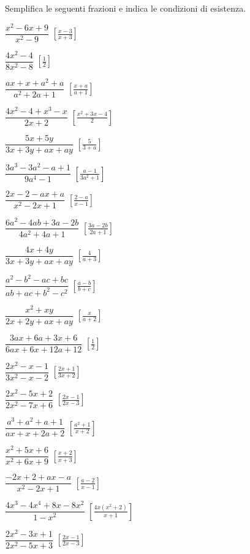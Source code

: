 \begin{esercizio}[\Ast]
\label{ese:19.5}
Semplifica le seguenti frazioni e indica le condizioni di esistenza.
\begin{multicols}{2}
\begin{enumeratea}
 \item $\dfrac{x^{2}-6x+9}{x^{2}-9}$
  \hfill $\left[\frac{x-3}{x+3}\right]$
 \item $\dfrac{4x^{2}-4}{8x^{2}-8}$
  \hfill $\left[\frac{1}{2}\right]$
 \item $\dfrac{ax+x+a^{2}+a}{a^{2}+2a+1}$
  \hfill $\left[\frac{x+a}{a+1}\right]$
 \item $\dfrac{4x^{2}-4+x^{3}-x}{2x+2}$
  \hfill $\left[\frac{x^{2}+3x-4}{2}\right]$
 \item $\dfrac{5x+5y}{3x+3y+ax+ay}$
  \hfill $\left[\frac{5}{3+a}\right]$
 \item $\dfrac{3a^{3}-3a^{2}-a+1}{9a^{4}-1}$
  \hfill $\left[\frac{a-1}{3a^{2}+1}\right]$
 \item $\dfrac{2x-2-ax+a}{x^{2}-2x+1}$
  \hfill $\left[\frac{2-a}{x-1}\right]$
 \item $\dfrac{6a^{2}-4ab+3a-2b}{4a^{2}+4a+1}$
  \hfill $\left[\frac{3a-2b}{2a+1}\right]$
 \item $\dfrac{4x+4y}{3x+3y+ax+ay}$
  \hfill $\left[\frac{4}{a+3}\right]$
 \item $\dfrac{a^{2}-b^{2}-ac+bc}{ab+ac+b^{2}-c^{2}}$
  \hfill $\left[\frac{a-b}{b+c}\right]$
 \item $\dfrac{x^{2}+xy}{2x+2y+ax+ay}$
  \hfill $\left[\frac{x}{a+2}\right]$
 \item $\dfrac{3ax+6a+3x+6}{6ax+6x+12a+12}$
  \hfill $\left[\frac{1}{2}\right]$
 \item $\dfrac{2x^{2}-x-1}{3x^{2}-x-2}$
  \hfill $\left[\frac{2x+1}{3x+2}\right]$
 \item $\dfrac{2x^{2}-5x+2}{2x^{2}-7x+6}$
  \hfill $\left[\frac{2x-1}{2x-3}\right]$
 \item $\dfrac{a^{3}+a^{2}+a+1}{ax+x+2a+2}$
  \hfill $\left[\frac{a^2+1}{x+2}\right]$
 \item $\dfrac{x^{2}+5x+6}{x^{2}+6x+9}$
  \hfill $\left[\frac{x+2}{x+3}\right]$
 \item $\dfrac{-2x+2+ax-a}{x^{2}-2x+1}$
  \hfill $\left[\frac{a-2}{x-1}\right]$
 \item $\dfrac{4x^{3}-4x^{4}+8x-8x^{2}}{1-x^{2}}$
  \hfill $\left[\frac{4x\left(x^2+2\right)}{x+1}\right]$
 \item $\dfrac{2x^{2}-3x+1}{2x^{2}-5x+3}$
  \hfill $\left[\frac{2x-1}{2x-3}\right]$

\end{enumeratea}
\end{multicols}
\end{esercizio}
